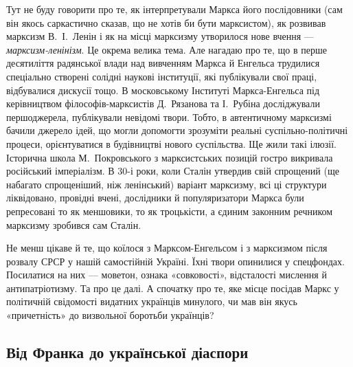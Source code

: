 Тут не буду говорити про те, як інтерпретували Маркса його 
послідовники (сам він якось саркастично сказав, що не хотів би бути 
марксистом), як розвивав марксизм В.~І.~Ленін і як на місці марксизму 
утворилося нове вчення — \emph{марксизм-ленінізм}. Це окрема велика тема. 
Але нагадаю про те, що в перше десятиліття радянської влади над 
вивченням Маркса й Енгельса трудилися спеціально створені солідні 
наукові інституції, які публікували свої праці, відбувалися дискусії 
тощо. В московському Інституті Маркса-Енгельса під керівництвом 
філософів-марксистів Д.~Рязанова та І.~Рубіна досліджували 
першоджерела, публікували невідомі твори. Тобто, в автентичному 
марксизмі бачили джерело ідей, що могли допомогти зрозуміти реальні 
суспільно-політичні процеси, орієнтуватися в будівництві нового 
суспільства. Ще жили такі ілюзії. Історична школа М.~Покровського з 
марксистських позицій гостро викривала російський імперіалізм. В 30-і 
роки, коли Сталін утвердив свій спрощений (ще набагато спрощеніший, 
ніж ленінський) варіант марксизму, всі ці структури ліквідовано, 
провідні вчені, дослідники й популяризатори Маркса були репресовані 
то як меншовики, то як троцькісти, а єдиним законним речником 
марксизму зробився сам Сталін.


Не менш цікаве й те, що коїлося з Марксом-Енгельсом і з марксизмом 
після розвалу СРСР у нашій самостійній Україні. Їхні твори опинилися у 
спецфондах. Посилатися на них — моветон, ознака «совковості», 
відсталості мислення й антипатріотизму. Та про це далі. А спочатку про 
те, яке місце посідав Маркс у політичній свідомості видатних 
українців минулого, чи мав він якусь «причетність» до визвольної 
боротьби українців?


\subsection*{Від Франка до української діаспори}

